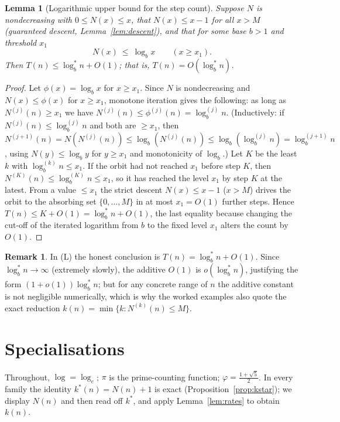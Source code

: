 \documentclass[12pt]{article}
\newtheorem{lemma}{Lemma}
\theoremstyle{definition}
\newtheorem{remark}{Remark}
\begin{document}
\begin{lemma}[Logarithmic upper bound for the step count]\label{lem:upper}
Suppose $N$ is nondecreasing with $0\le N(x)\le x$, that $N(x)\le x-1$ for all $x>M$
(guaranteed descent, Lemma~\ref{lem:descent}), and that for some base $b>1$ and
threshold $x_1$
\[
  N(x)\ \le\ \log_b x\qquad (x\ge x_1).
\]
Then $T(n)\le \log^*_b n+O(1)$; that is, $T(n)=O(\log^*_b n)$.
\end{lemma}

\begin{proof}
Let $\phi(x)=\log_b x$ for $x\ge x_1$. Since $N$ is nondecreasing and $N(x)\le\phi(x)$
for $x\ge x_1$, monotone iteration gives the following: as long as $N^{(j)}(n)\ge x_1$
we have $N^{(j)}(n)\le \phi^{(j)}(n)=\log^{(j)}_b n$. (Inductively: if
$N^{(j)}(n)\le\log^{(j)}_b n$ and both are $\ge x_1$, then
$N^{(j+1)}(n)=N(N^{(j)}(n))\le \log_b(N^{(j)}(n))\le\log_b(\log^{(j)}_b n)
=\log^{(j+1)}_b n$, using $N(y)\le\log_b y$ for $y\ge x_1$ and monotonicity of
$\log_b$.) Let $K$ be the least $k$ with $\log^{(k)}_b n\le x_1$. If the orbit had not
reached $x_1$ before step $K$, then $N^{(K)}(n)\le \log^{(K)}_b n\le x_1$, so it has
reached the level $x_1$ by step $K$ at the latest. From a value $\le x_1$ the strict
descent $N(x)\le x-1$ ($x>M$) drives the orbit to the absorbing set $\{0,\dots,M\}$ in
at most $x_1=O(1)$ further steps. Hence $T(n)\le K+O(1)=\log^*_b n+O(1)$, the last
equality because changing the cut-off of the iterated logarithm from $b$ to the fixed
level $x_1$ alters the count by $O(1)$.
\end{proof}


\begin{remark}
In (L) the honest conclusion is $T(n)=\log^*_b n+O(1)$. Since $\log^*_b n\to\infty$
(extremely slowly), the additive $O(1)$ is $o(\log^*_b n)$, justifying the form
$(1+o(1))\log^*_b n$; but for any concrete range of $n$ the additive constant is not
negligible numerically, which is why the worked examples also quote the exact
reduction $k(n)=\min\{k:N^{(k)}(n)\le M\}$.
\end{remark}

\section{Specialisations}

Throughout, $\log=\log_e$; $\pi$ is the prime-counting function;
$\varphi=\tfrac{1+\sqrt5}2$. In every family the identity $k^*(n)=N(n)+1$ is exact
(Proposition~\ref{prop:kstar}); we display $N(n)$ and then read off $k^*$, and apply
Lemma~\ref{lem:rates} to obtain $k(n)$.
\end{document}
